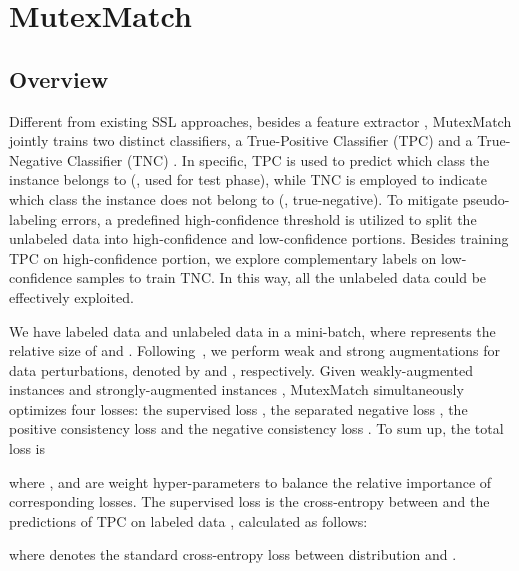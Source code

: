 \documentclass[lettersize,journal]{IEEEtran}
\theoremstyle{plain}
\theoremstyle{definition}
\theoremstyle{remark}
\begin{document}
\section{MutexMatch}
\label{sec:method}
\subsection{Overview}

Different from existing SSL approaches, besides a feature extractor , MutexMatch jointly trains two distinct classifiers, a True-Positive Classifier (TPC)  and a True-Negative Classifier (TNC) . In specific, TPC is used to predict which class the instance belongs to (\ie, used for test phase), while TNC is employed to indicate which class the instance does not belong to (\ie, true-negative). To mitigate pseudo-labeling errors, a predefined high-confidence threshold  is utilized to split the unlabeled data into high-confidence and low-confidence portions. 
Besides training TPC on high-confidence portion, we explore complementary labels on low-confidence samples to train TNC. 
In this way, all the unlabeled data could be effectively exploited. 


We have  labeled data  and  unlabeled data  in a mini-batch, where  represents the relative size of  and . Following~\cite{sohn2020fixmatch}, we perform weak and strong augmentations for data perturbations, denoted by  and , respectively. Given weakly-augmented instances  and strongly-augmented instances , MutexMatch simultaneously optimizes four losses: the supervised loss , the separated negative loss , the positive consistency loss  and the negative consistency loss . To sum up, the total loss is

where  ,  and  are weight hyper-parameters to balance the relative importance of corresponding losses. The supervised loss  is the cross-entropy between  and the predictions of TPC on labeled data , calculated as follows:

where  denotes the standard cross-entropy loss between distribution  and .
\end{document}
